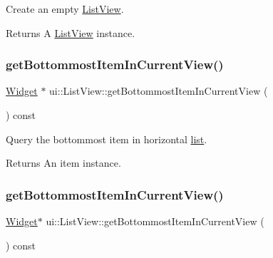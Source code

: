 Create an empty \hyperlink{classui_1_1ListView}{List\+View}. \begin{DoxyReturn}{Returns}
A \hyperlink{classui_1_1ListView}{List\+View} instance. 
\end{DoxyReturn}
\mbox{\label{classui_1_1ListView_af4d954d5d1e8cb870c3026ddbd131d44}} 
\subsubsection{\texorpdfstring{get\+Bottommost\+Item\+In\+Current\+View()}{getBottommostItemInCurrentView()}\hspace{0.1cm}{\footnotesize\ttfamily [1/2]}}
{\footnotesize\ttfamily \hyperlink{classui_1_1Widget}{Widget} $\ast$ ui\+::\+List\+View\+::get\+Bottommost\+Item\+In\+Current\+View (\begin{DoxyParamCaption}{ }\end{DoxyParamCaption}) const}



Query the bottommost item in horizontal \hyperlink{protocollist-p}{list}. 

\begin{DoxyReturn}{Returns}
An item instance. 
\end{DoxyReturn}
\mbox{\label{classui_1_1ListView_ac3946e3858a88bfdefb9b597e09a581b}} 
\subsubsection{\texorpdfstring{get\+Bottommost\+Item\+In\+Current\+View()}{getBottommostItemInCurrentView()}\hspace{0.1cm}{\footnotesize\ttfamily [2/2]}}
{\footnotesize\ttfamily \hyperlink{classui_1_1Widget}{Widget}$\ast$ ui\+::\+List\+View\+::get\+Bottommost\+Item\+In\+Current\+View (\begin{DoxyParamCaption}{ }\end{DoxyParamCaption}) const}



